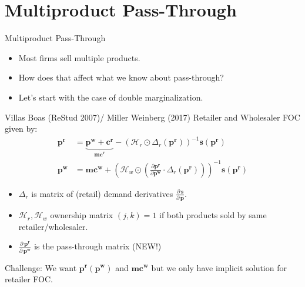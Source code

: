 \section{Multiproduct Pass-Through}


\begin{frame}{Multiproduct Pass-Through}

\begin{itemize}
\item Most firms sell multiple products.
\item How does that affect what we know about pass-through?
\item Let's start with the case of \alert{double marginalization}.
\end{itemize}
\end{frame}

\begin{frame}{Villas Boas (ReStud 2007)/ Miller Weinberg (2017)}
Retailer and Wholesaler FOC given by:
\begin{align*}
\symbf{p^r} &= \underbrace{\symbf{p^w} +\symbf{c^r}}_{\symbf{mc^r}} -(\mathcal{H}_r \odot \Delta_{r}(\symbf{p^r}))^{-1} \symbf{s}(\symbf{p^r})\\
\symbf{p^w}  &= \symbf{mc^w} + \left(\mathcal{H}_{w} \odot \left( \frac{\partial \symbf{p^r}}{\partial \symbf{p^w}} \cdot  \Delta_r(\symbf{p^r} ) \right) \right)^{-1} \symbf{s}(\symbf{p^r})
\end{align*}
\begin{itemize}
  \item $\Delta_r$ is matrix of (retail) demand derivatives $\frac{\partial\, \symbf{s}}{\partial\, \symbf{p}}$.
\item $\mathcal{H}_r,\mathcal{H}_w$  ownership matrix $(j,k)=1$ if both products sold by same retailer/wholesaler.
\item $\frac{\partial\, \symbf{p^r}}{\partial\, \symbf{p^w}}$ is the \alert{pass-through matrix} (NEW!)
\end{itemize}
Challenge: We want $\symbf{p^r}(\symbf{p^w})$ and $\symbf{mc^w}$ but we only have implicit solution for retailer FOC.
\end{frame}

